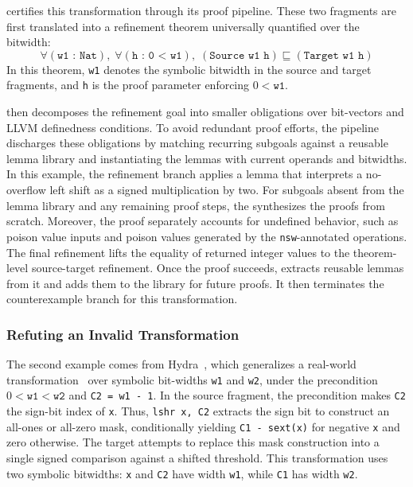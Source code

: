 \proj certifies this transformation through its proof pipeline.
These two fragments are first translated into a refinement theorem
universally quantified over the bitwidth:
\[
\forall (\texttt{w1 : Nat}),\;
  \forall (\texttt{h : 0 < w1}),\;
  (\texttt{Source w1 h}) \sqsubseteq (\texttt{Target w1 h})
\]
In this theorem, \texttt{w1} denotes the symbolic bitwidth
in the source and target fragments, and \texttt{h} is
the proof parameter enforcing \(0 < \texttt{w1}\).

\proj then decomposes the refinement goal into smaller
obligations over bit-vectors and LLVM definedness conditions.
To avoid redundant proof efforts, the pipeline discharges these
obligations by matching recurring subgoals against a reusable
lemma library and instantiating the lemmas with current
operands and bitwidths. In this example, the refinement branch
applies a lemma that interprets a no-overflow left shift
as a signed multiplication by two.
For subgoals absent from the lemma library and any remaining
proof steps, the \llm synthesizes the proofs from scratch.
Moreover, the proof separately accounts for undefined behavior,
such as poison value inputs and poison values generated by
the \texttt{nsw}-annotated operations. The final refinement
lifts the equality of returned integer values to the
theorem-level source-target refinement. Once the proof succeeds,
\proj extracts reusable lemmas from it and adds them to the library
for future proofs. It then terminates the counterexample branch for this
transformation.

\subsubsection{Refuting an Invalid Transformation}

The second example comes from Hydra~\cite{hydra}, which generalizes a
real-world \llvm transformation~\cite{illustrative_example2_issue}
over symbolic bit-widths \texttt{w1} and
\texttt{w2}, under the precondition $0 < \texttt{w1} < \texttt{w2}$
and \texttt{C2 = w1 - 1}.
In the source fragment, the precondition makes \texttt{C2} the
sign-bit index of \texttt{x}. Thus, \texttt{lshr x, C2} extracts
the sign bit to construct an all-ones or all-zero mask,
conditionally yielding \texttt{C1 - sext(x)} for negative
\texttt{x} and zero otherwise. The target attempts to replace
this mask construction into a single signed comparison against
a shifted threshold.
This transformation uses two symbolic bitwidths: \texttt{x} and
\texttt{C2} have width \texttt{w1}, while \texttt{C1} has width
\texttt{w2}.

